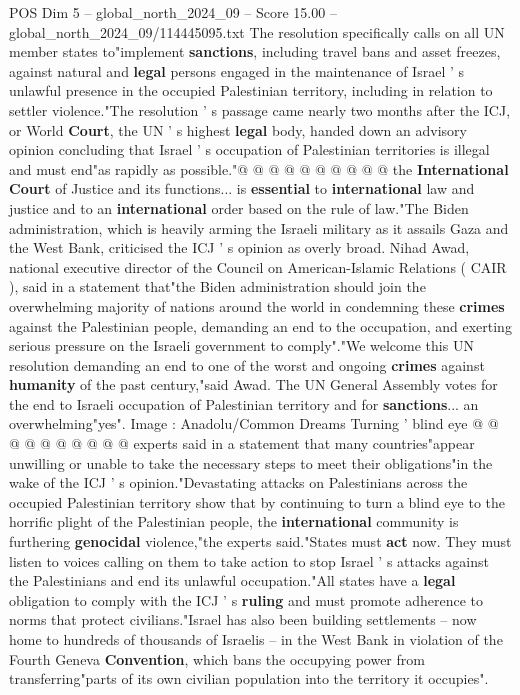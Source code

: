 \begin{textsample}{POS Dim 5 – global\_north\_2024\_09 – Score 15.00 – global\_north\_2024\_09/114445095.txt}
The resolution specifically calls on all UN member states to"implement \textbf{sanctions}, including travel bans and asset freezes, against natural and \textbf{legal} persons engaged in the maintenance of Israel ' s unlawful presence in the occupied Palestinian territory, including in relation to settler violence."The resolution ' s passage came nearly two months after the ICJ, or World \textbf{Court}, the UN ' s highest \textbf{legal} body, handed down an advisory opinion concluding that Israel ' s occupation of Palestinian territories is illegal and must end"as rapidly as possible."@ @ @ @ @ @ @ @ @ @ the \textbf{International} \textbf{Court} of Justice and its functions... is \textbf{essential} to \textbf{international} law and justice and to an \textbf{international} order based on the rule of law."The Biden administration, which is heavily arming the Israeli military as it assails Gaza and the West Bank, criticised the ICJ ' s opinion as overly broad.
Nihad Awad, national executive director of the Council on American-Islamic Relations ( CAIR ), said in a statement that"the Biden administration should join the overwhelming majority of nations around the world in condemning these \textbf{crimes} against the Palestinian people, demanding an end to the occupation, and exerting serious pressure on the Israeli government to comply"."We welcome this UN resolution demanding an end to one of the worst and ongoing \textbf{crimes} against \textbf{humanity} of the past century,"said Awad.
The UN General Assembly votes for the end to Israeli occupation of Palestinian territory and for \textbf{sanctions}... an overwhelming"yes".
Image : Anadolu/Common Dreams Turning ' blind eye @ @ @ @ @ @ @ @ @ @ experts said in a statement that many countries"appear unwilling or unable to take the necessary steps to meet their obligations"in the wake of the ICJ ' s opinion."Devastating attacks on Palestinians across the occupied Palestinian territory show that by continuing to turn a blind eye to the horrific plight of the Palestinian people, the \textbf{international} community is furthering \textbf{genocidal} violence,"the experts said."States must \textbf{act} now.
They must listen to voices calling on them to take action to stop Israel ' s attacks against the Palestinians and end its unlawful occupation."All states have a \textbf{legal} obligation to comply with the ICJ ' s \textbf{ruling} and must promote adherence to norms that protect civilians."Israel has also been building settlements -- now home to hundreds of thousands of Israelis -- in the West Bank in violation of the Fourth Geneva \textbf{Convention}, which bans the occupying power from transferring"parts of its own civilian population into the territory it occupies".

\end{textsample}
